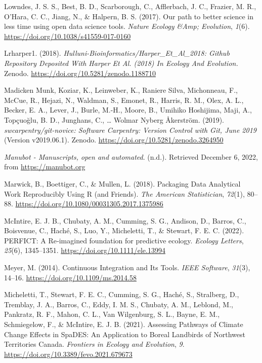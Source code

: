 \begin{CSLReferences}{1}{0}
\leavevmode{}%
Lowndes, J. S. S., Best, B. D., Scarborough, C., Afflerbach, J. C., Frazier, M. R., O'Hara, C. C., Jiang, N., \& Halpern, B. S. (2017). Our path to better science in less time using open data science tools. \emph{Nature Ecology \&Amp; Evolution}, \emph{1}(6). \url{https://doi.org/10.1038/s41559-017-0160}

\leavevmode{}%
Lrharper1. (2018). \emph{Hulluni-Bioinformatics/Harper\_Et\_Al\_2018: Github Repository Deposited With Harper Et Al. (2018) In Ecology And Evolution.} Zenodo. \url{https://doi.org/10.5281/zenodo.1188710}

\leavevmode{}%
Madicken Munk, Koziar, K., Leinweber, K., Raniere Silva, Michonneau, F., McCue, R., Hejazi, N., Waldman, S., Emonet, R., Harris, R. M., Olex, A. L., Becker, E. A., Lever, J., Burle, M.-H., Moore, B., Umihiko Hoshijima, Maji, A., Topçuoğlu, B. D., Junghans, C., \ldots{} Wolmar Nyberg Åkerström. (2019). \emph{swcarpentry/git-novice: Software Carpentry: Version Control with Git, June 2019} (Version v2019.06.1). Zenodo. \url{https://doi.org/10.5281/zenodo.3264950}

\leavevmode{}%
\emph{Manubot - Manuscripts, open and automated}. (n.d.). Retrieved December 6, 2022, from \url{https://manubot.org}

\leavevmode{}%
Marwick, B., Boettiger, C., \& Mullen, L. (2018). Packaging Data Analytical Work Reproducibly Using R (and Friends). \emph{The American Statistician}, \emph{72}(1), 80--88. \url{https://doi.org/10.1080/00031305.2017.1375986}

\leavevmode{}%
McIntire, E. J. B., Chubaty, A. M., Cumming, S. G., Andison, D., Barros, C., Boisvenue, C., Haché, S., Luo, Y., Micheletti, T., \& Stewart, F. E. C. (2022). PERFICT: A Re‐imagined foundation for predictive ecology. \emph{Ecology Letters}, \emph{25}(6), 1345--1351. \url{https://doi.org/10.1111/ele.13994}

\leavevmode{}%
Meyer, M. (2014). Continuous Integration and Its Tools. \emph{IEEE Software}, \emph{31}(3), 14--16. \url{https://doi.org/10.1109/ms.2014.58}

\leavevmode{}%
Micheletti, T., Stewart, F. E. C., Cumming, S. G., Haché, S., Stralberg, D., Tremblay, J. A., Barros, C., Eddy, I. M. S., Chubaty, A. M., Leblond, M., Pankratz, R. F., Mahon, C. L., Van Wilgenburg, S. L., Bayne, E. M., Schmiegelow, F., \& McIntire, E. J. B. (2021). Assessing Pathways of Climate Change Effects in SpaDES: An Application to Boreal Landbirds of Northwest Territories Canada. \emph{Frontiers in Ecology and Evolution}, \emph{9}. \url{https://doi.org/10.3389/fevo.2021.679673}


\end{CSLReferences}
